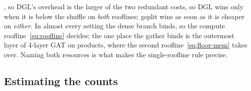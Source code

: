 , so DGL's overhead is the larger of the two
redundant costs, so DGL wins only when it is below the shuffle on \emph{both} rooflines; gsplit wins
as soon as it is cheaper on \emph{either}. In almost every setting the dense branch binds, so the
compute roofline~\eqref{eq:roofline} decides; the one place the gather binds is the outermost layer of
4-layer GAT on products, where the second roofline~\eqref{eq:floor-mem} takes over. Naming both
resources is what makes the single-roofline rule precise.

\subsection{Estimating the counts}
\label{sec:cm-estimate}

